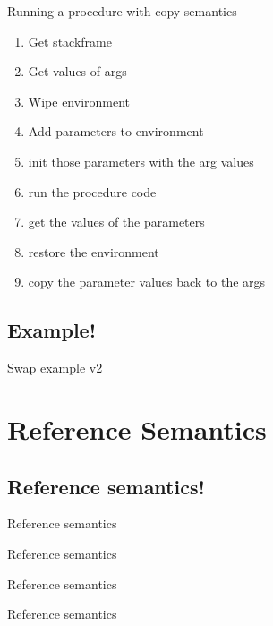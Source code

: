\begin{frame}{Running a procedure with copy semantics}
    \begin{enumerate}
        \item Get stackframe
        \item Get values of args
        \item Wipe environment
        \item Add parameters to environment
        \item init those parameters with the arg values
        \item run the procedure code
        \item get the values of the parameters
        \item restore the environment
        \item copy the parameter values back to the args
    \end{enumerate}
\end{frame}


\subsection{Example!}
\begin{frame}{Swap example v2}
    
\end{frame}
\section{Reference Semantics}
\subsection{Reference semantics!}
\begin{frame}{Reference semantics}
    
\end{frame}

\begin{frame}{Reference semantics}
    
\end{frame}
\begin{frame}{Reference semantics}
    
\end{frame}
\begin{frame}{Reference semantics}
    
\end{frame}


